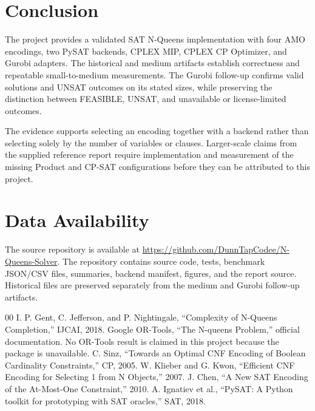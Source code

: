 \documentclass[a4paper,fleqn]{cas-sc}
\begin{document}
\section{Conclusion}

The project provides a validated SAT N-Queens implementation with four AMO
encodings, two PySAT backends, CPLEX MIP, CPLEX CP Optimizer, and Gurobi
adapters. The historical and medium artifacts establish correctness and
repeatable small-to-medium measurements. The Gurobi follow-up confirms valid
solutions and UNSAT outcomes on its stated sizes, while preserving the
distinction between FEASIBLE, UNSAT, and unavailable or license-limited
outcomes.

The evidence supports selecting an encoding together with a backend rather
than selecting solely by the number of variables or clauses. Larger-scale
claims from the supplied reference report require implementation and
measurement of the missing Product and CP-SAT configurations before they can
be attributed to this project.

\section*{Data Availability}
The source repository is available at
\url{https://github.com/DunnTapCodee/N-Queens-Solver}. The repository contains
source code, tests, benchmark JSON/CSV files, summaries, backend manifest,
figures, and the report source. Historical files are preserved separately from
the medium and Gurobi follow-up artifacts.

\begin{thebibliography}{00}
 I. P. Gent, C. Jefferson, and P. Nightingale, ``Complexity of
N-Queens Completion,'' IJCAI, 2018.
 Google OR-Tools, ``The N-queens Problem,'' official
documentation. No OR-Tools result is claimed in this project because the
package is unavailable.
 C. Sinz, ``Towards an Optimal CNF Encoding of Boolean
Cardinality Constraints,'' CP, 2005.
 W. Klieber and G. Kwon, ``Efficient CNF Encoding for
Selecting 1 from N Objects,'' 2007.
 J. Chen, ``A New SAT Encoding of the At-Most-One Constraint,''
2010.
 A. Ignatiev et al., ``PySAT: A Python toolkit for prototyping
with SAT oracles,'' SAT, 2018.
\end{thebibliography}
\end{document}
